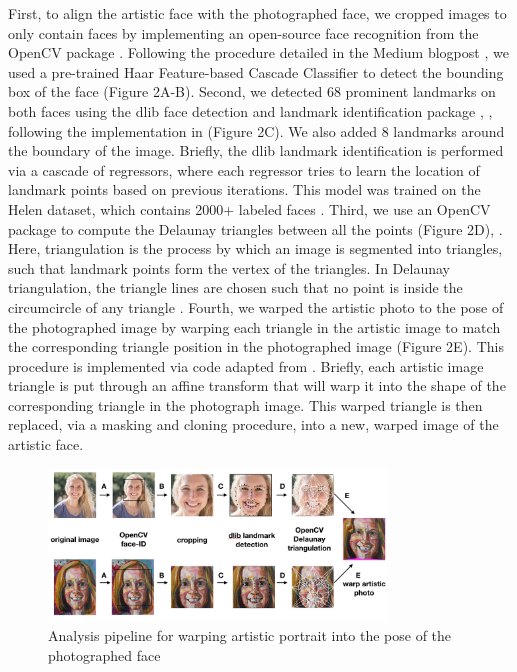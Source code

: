 \documentclass{article}
\begin{document}
First, to align the artistic face with the photographed face, we cropped images to only contain faces by implementing an open-source face recognition from the OpenCV package \cite{opencv_library}. Following the procedure detailed in the Medium blogpost \cite{Medium}, we used a pre-trained Haar Feature-based Cascade Classifier to detect the bounding box of the face (Figure 2A-B). Second, we detected 68 prominent landmarks on both faces using the dlib face detection and landmark identification package \cite{dlibgit}, \cite{dlib09}, following the implementation in \cite{opencvImplement} (Figure 2C). We also added 8 landmarks around the boundary of the image. Briefly, the dlib landmark identification is performed via a cascade of regressors, where each regressor tries to learn the location of landmark points based on previous iterations. This model was trained on the Helen dataset, which contains 2000+ labeled faces \cite{Helen}. Third, we use an OpenCV package to compute the Delaunay triangles between all the points (Figure 2D), \cite{opencvImplement}. Here, triangulation is the process by which an image is segmented into triangles, such that landmark points form the vertex of the triangles. In Delaunay triangulation, the triangle lines are chosen such that no point is inside the circumcircle of any triangle \cite{dt}. Fourth, we warped the artistic photo to the pose of the photographed image by warping each triangle in the artistic image to match the corresponding triangle position in the photographed image (Figure 2E). This procedure is implemented via code adapted from \cite{opencvImplement}. Briefly, each artistic image triangle is put through an affine transform that will warp it into the shape of the corresponding triangle in the photograph image. This warped triangle is then replaced, via a masking and cloning procedure, into a new, warped image of the artistic face.

\begin{figure}[H]
  \begin{center}
    \includegraphics[width=0.8\textwidth]{phase_one_pipeline.jpg}
    \caption{Analysis pipeline for warping artistic portrait into the pose of the photographed face} \label{fig:examples}
  \end{center}
\end{figure} 
\end{document}
